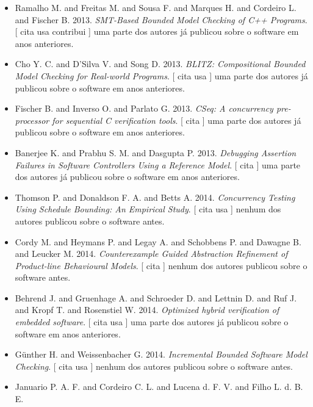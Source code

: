 \begin{itemize}
      [
          cita
      ]
uma parte dos autores já publicou sobre o software em anos anteriores.
\item Ramalho M. and Freitas M. and Sousa F. and Marques H. and Cordeiro L. and Fischer B.
      2013.
        \textit{ SMT-Based Bounded Model Checking of C++ Programs}.
      [
          cita
          usa
          contribui
      ]
uma parte dos autores já publicou sobre o software em anos anteriores.
\item Cho Y. C. and D'Silva V. and Song D.
      2013.
        \textit{ BLITZ: Compositional Bounded Model Checking for Real-world Programs}.
      [
          cita
          usa
      ]
uma parte dos autores já publicou sobre o software em anos anteriores.
\item Fischer B. and Inverso O. and Parlato G.
      2013.
        \textit{ CSeq: A concurrency pre-processor for sequential C verification tools}.
      [
          cita
      ]
uma parte dos autores já publicou sobre o software em anos anteriores.
\item Banerjee K. and Prabhu S. M. and Dasgupta P.
      2013.
        \textit{ Debugging Assertion Failures in Software Controllers Using a Reference Model}.
      [
          cita
      ]
uma parte dos autores já publicou sobre o software em anos anteriores.
\item Thomson P. and Donaldson F. A. and Betts A.
      2014.
        \textit{ Concurrency Testing Using Schedule Bounding: An Empirical Study}.
      [
          cita
          usa
      ]
nenhum dos autores publicou sobre o software antes.
\item Cordy M. and Heymans P. and Legay A. and Schobbens P. and Dawagne B. and Leucker M.
      2014.
        \textit{ Counterexample Guided Abstraction Refinement of Product-line Behavioural Models}.
      [
          cita
      ]
nenhum dos autores publicou sobre o software antes.
\item Behrend J. and Gruenhage A. and Schroeder D. and Lettnin D. and Ruf J. and Kropf T. and Rosenstiel W.
      2014.
        \textit{ Optimized hybrid verification of embedded software}.
      [
          cita
          usa
      ]
uma parte dos autores já publicou sobre o software em anos anteriores.
\item G\"{u}nther H. and Weissenbacher G.
      2014.
        \textit{ Incremental Bounded Software Model Checking}.
      [
          cita
          usa
      ]
nenhum dos autores publicou sobre o software antes.
\item Januario P. A. F. and Cordeiro C. L. and Lucena d. F. V. and Filho L. d. B. E.

\end{itemize}
